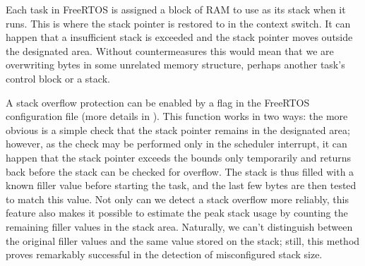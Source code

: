 Each task in FreeRTOS is assigned a block of \gls{RAM} to use as its stack when it runs. This is where the stack pointer is restored to in the context switch. It can happen that a insufficient stack is exceeded and the stack pointer moves outside the designated area. Without countermeasures this would mean that we are overwriting bytes in some unrelated memory structure, perhaps another task's control block or a stack.

A stack overflow protection can be enabled by a flag in the FreeRTOS configuration file (more details in \cite{freertos-stackov}). This function works in two ways: the more obvious is a simple check that the stack pointer remains in the designated area; however, as the check may be performed only in the scheduler interrupt, it can happen that the stack pointer exceeds the bounds only temporarily and returns back before the stack can be checked for overflow. The stack is thus filled with a known filler value before starting the task, and the last few bytes are then tested to match this value. Not only can we detect a stack overflow more reliably, this feature also makes it possible to estimate the peak stack usage by counting the remaining filler values in the stack area. Naturally, we can't distinguish between the original filler values and the same value stored on the stack; still, this method proves remarkably successful in the detection of misconfigured stack size.














